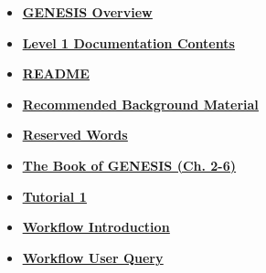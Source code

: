 \documentclass[12pt]{article}
\begin{document}
\begin{itemize}
\item \href{../genesis-overview/genesis-overview.pdf}{\bf \underline{GENESIS Overview}}

\item \href{../contents-level1/contents-level1.pdf}{\bf \underline{Level 1 Documentation Contents}}

\item \href{../README/README.pdf}{\bf \underline{README}}

\item \href{../background-material/background-material.pdf}{\bf \underline{Recommended Background Material}}

\item \href{../reserved-words/reserved-words.pdf}{\bf \underline{Reserved Words}}

\item \href{../book-of-genesis/book-of-genesis.pdf}{\bf \underline{The Book of GENESIS (Ch. 2-6)}}

\item \href{../tutorial1/tutorial1.pdf}{\bf \underline{Tutorial 1}}

\item \href{../workflow-intro/workflow-intro.pdf}{\bf \underline{Workflow Introduction}}

\item \href{../workflow-user-query/workflow-user-query.pdf}{\bf \underline{Workflow User Query}}


\end{itemize}

\end{document}
